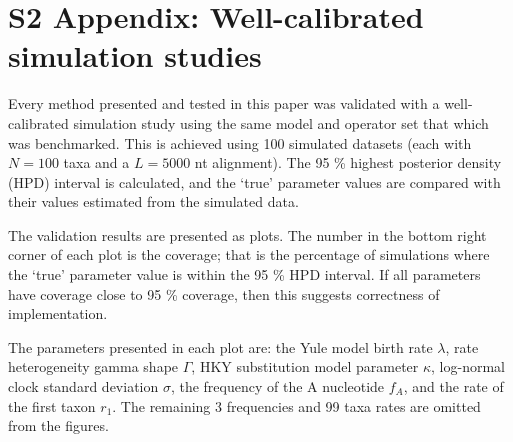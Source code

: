 \documentclass[12pt]{article}
\begin{document}
\section*{S2 Appendix: Well-calibrated simulation studies}


Every method presented and tested in this paper was validated with a well-calibrated simulation study using the same model and operator set that which was benchmarked. This is achieved using 100 simulated datasets (each with $N=100$ taxa and a $L=5000$ nt alignment). The 95 \% highest posterior density (HPD) interval is calculated, and the `true' parameter values are compared with their values estimated from the simulated data. 


The validation results are presented as plots. The number in the bottom right corner of each plot is the coverage; that is the percentage of simulations where the `true' parameter value is within the 95 \% HPD interval. If all parameters have coverage close to 95 \% coverage, then this suggests correctness of implementation.


The parameters presented in each plot are: the Yule model birth rate $\lambda$, rate heterogeneity gamma shape $\Gamma$, HKY substitution model parameter $\kappa$, log-normal clock standard deviation $\sigma$, the frequency of the A nucleotide $f_A$, and the rate of the first taxon $r_1$. The remaining 3 frequencies and 99 taxa rates are omitted from the figures. 
\end{document}
